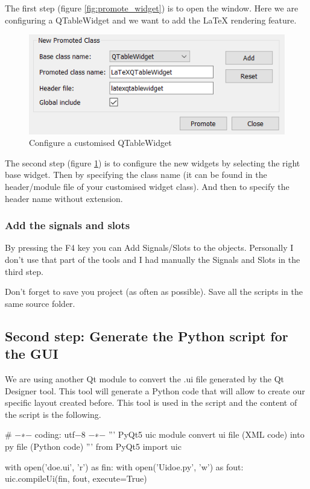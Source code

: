 \documentclass[english, 12 pt, openany, oneside]{book}
\begin{document}
The first step (figure \ref{fig:promote_widget}) is to open the  window. Here we are configuring a QTableWidget and we want to add the LaTeX rendering feature.

\begin{figure}[!ht]
\centering
\includegraphics[width=0.6\linewidth]{config_promote}
\caption{Configure a customised QTableWidget\label{fig:config_promote}}
\end{figure}

The second step (figure \ref{fig:config_promote}) is to configure the new widgets by selecting the right base widget. Then by specifying the class name (it can be found in the header/module file of your customised widget class). And then to specify the header name without extension.

\subsubsection{Add the signals and slots}
By pressing the F4 key you can Add Signals/Slots to the objects. Personally I don't use that part of the tools and I had manually the Signals and Slots in the third step.

Don't forget to save you project (as often as possible). Save all the scripts in the same source folder.

\subsection{Second step: Generate the Python script for the GUI}
We are using another Qt module to convert the .ui file generated by the Qt Designer tool. This tool will generate a Python code that will allow to create our specific layout created before. This tool is used in the  script and the content of the script is the following.

\begin{pyverbatim}
# −∗− coding: utf−8 −∗−
''' PyQt5 uic module convert ui file (XML code) into py file (Python code) '''
from PyQt5 import uic

with open('doe.ui', 'r') as fin:
    with open('Uidoe.py', 'w') as fout:
        uic.compileUi(fin, fout, execute=True)
\end{pyverbatim}
\end{document}
